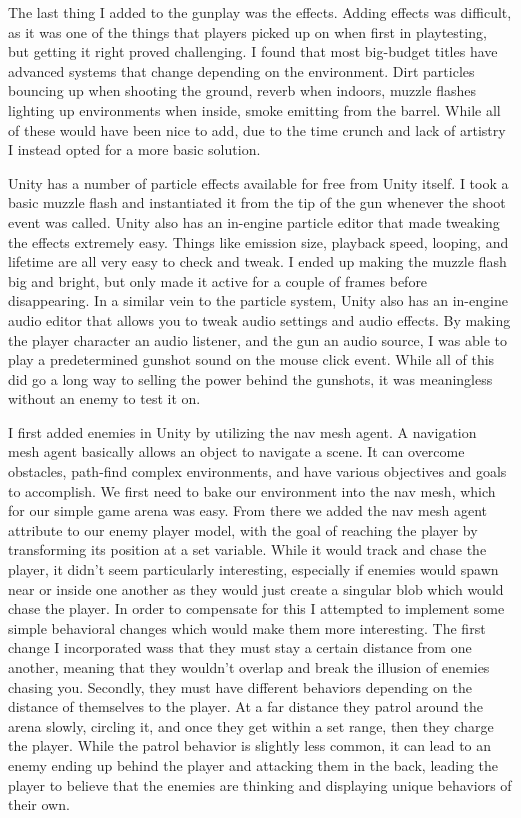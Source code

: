 \documentclass[10pt,twocolumn]{article}
\begin{document}
The last thing I added to the gunplay was the effects. Adding effects was difficult, as it was one of the things that players picked up on when first in playtesting, but getting it right proved challenging. I found that most big-budget titles have advanced systems that change depending on the environment. Dirt particles bouncing up when shooting the ground, reverb when indoors, muzzle flashes lighting up environments when inside, smoke emitting from the barrel. While all of these would have been nice to add, due to the time crunch and lack of artistry I instead opted for a more basic solution.

Unity has a number of particle effects available for free from Unity itself. I took a basic muzzle flash and instantiated it from the tip of the gun whenever the shoot event was called. Unity also has an in-engine particle editor that made tweaking the effects extremely easy. Things like emission size, playback speed, looping, and lifetime are all very easy to check and tweak. I ended up making the muzzle flash big and bright, but only made it active for a couple of frames before disappearing. In a similar vein to the particle system, Unity also has an in-engine audio editor that allows you to tweak audio settings and audio effects. By making the player character an audio listener, and the gun an audio source, I was able to play a predetermined gunshot sound on the mouse click event. While all of this did go a long way to selling the power behind the gunshots, it was meaningless without an enemy to test it on.

I first added enemies in Unity by utilizing the nav mesh agent. A navigation mesh agent basically allows an object to navigate a scene. It can overcome obstacles, path-find complex environments, and have various objectives and goals to accomplish. We first need to bake our environment into the nav mesh, which for our simple game arena was easy. From there we added the nav mesh agent attribute to our enemy player model, with the goal of reaching the player by transforming its position at a set variable. While it would track and chase the player, it didn’t seem particularly interesting, especially if enemies would spawn near or inside one another as they would just create a singular blob which would chase the player. In order to compensate for this I attempted to implement some simple behavioral changes which would make them more interesting. The first change I incorporated wass that they must stay a certain distance from one another, meaning that they wouldn’t overlap and break the illusion of enemies chasing you. Secondly, they must have different behaviors depending on the distance of themselves to the player. At a far distance they patrol around the arena slowly, circling it, and once they get within a set range, then they charge the player. While the patrol behavior is slightly less common, it can lead to an enemy ending up behind the player and attacking them in the back, leading the player to believe that the enemies are thinking and displaying unique behaviors of their own. 
\end{document}
